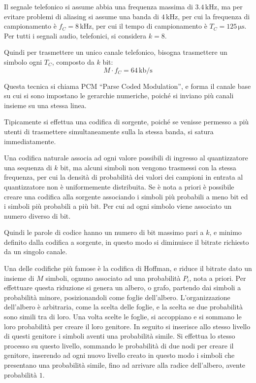 \documentclass{article}
\numberwithin{equation}{subsection}
\begin{document}
Il segnale telefonico si assume abbia una frequenza massima di $3.4\,\mathrm{kHz}$, ma per evitare problemi di aliasing si assume una banda di $4\,\mathrm{kHz}$, 
per cui la frequenza di campionamento è $f_C=8\,\mathrm{kHz}$, 
per cui il tempo di campionamento è $T_C=125\,\mathrm{\mu s}$. Per tutti i segnali audio, telefonici, si considera $k=8$. 

Quindi per trasmettere un unico canale telefonico, bisogna trasmettere un simbolo ogni $T_C$, composto da $k$ bit:
\begin{equation}
    M\cdot f_C=64\,\mathrm{kb/s}
\end{equation}

Questa tecnica si chiama PCM ``Parse Coded Modulation'', e forma il canale base su cui si sono impostano le gerarchie numeriche, poiché si inviano più 
canali insieme su una stessa linea. 


Tipicamente si effettua una codifica di sorgente, poiché se venisse permesso a più utenti di trasmettere simultaneamente sulla la stessa banda, 
si satura immediatamente. 

Una codifica naturale associa ad ogni valore possibili di ingresso al quantizzatore una sequenza di $k$ bit, ma alcuni simboli non vengono trasmessi con la stessa frequenza, 
per cui la densità di probabilità dei valori dei campioni in entrata al quantizzatore non è uniformemente distribuita. Se è nota a priori è possibile 
creare una codifica alla sorgente associando i simboli più probabili a meno bit ed i simboli più probabili a più bit. Per cui ad ogni simbolo viene associato un numero 
diverso di bit. 

Quindi le parole di codice hanno un numero di bit massimo pari a $k$, e minimo definito dalla codifica a sorgente, in questo modo si diminuisce il bitrate richiesto da un 
singolo canale. 


Una delle codifiche più famose è la codifica di Hoffman, e riduce il bitrate dato un insieme di $M$ simboli, ognuno associato ad una probabilità $P_i$, nota a priori. 
Per effettuare questa riduzione si genera un albero, o grafo, partendo dai simboli a probabilità minore, posizionandoli 
come foglie dell'albero. L'organizzazione dell'albero è arbitraria, come la scelta delle foglie, e la scelta se due probabilità sono simili tra di loro. 
Una volta scelte le foglie, si accoppiano e si sommano le loro probabilità per creare il loro genitore. In seguito si inserisce allo stesso livello di questi genitore 
i simboli aventi una probabilità simile. Si effettua lo stesso processo su questo livello, sommando le probabilità di due nodi per creare il genitore, inserendo 
ad ogni nuovo livello creato in questo modo i simboli che presentano una probabilità simile, fino ad arrivare alla radice dell'albero, avente probabilità $1$. 
\end{document}

